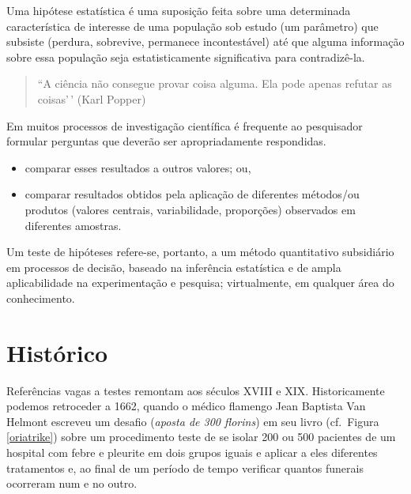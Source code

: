 \documentclass[
]{book}
\providecommand{\tightlist}{%
  \setlength{\itemsep}{0pt}\setlength{\parskip}{0pt}}
\begin{document}
\hfill\break

Uma hipótese estatística é uma suposição feita sobre uma determinada característica de interesse de uma população sob estudo (um parâmetro) que subsiste (perdura, sobrevive, permanece incontestável) até que alguma informação sobre essa população seja estatisticamente significativa para contradizê-la.

\hfill\break

\begin{quote}
``A ciência não consegue provar coisa alguma. Ela pode apenas refutar as coisas'\,' (Karl Popper)
\end{quote}

\hfill\break

Em muitos processos de investigação científica é frequente ao pesquisador formular perguntas que deverão ser apropriadamente respondidas.

\hfill\break

\begin{itemize}
\tightlist
\item
  comparar esses resultados a outros valores; ou,\\
\item
  comparar resultados obtidos pela aplicação de diferentes métodos/ou produtos (valores centrais, variabilidade, proporções) observados em diferentes amostras.
\end{itemize}

\hfill\break

Um teste de hipóteses refere-se, portanto, a um método quantitativo subsidiário em processos de decisão, baseado na inferência estatística e de ampla aplicabilidade na experimentação e pesquisa; virtualmente, em qualquer área do conhecimento.

\hfill\break

\hypertarget{histuxf3rico}{%
\section{Histórico}\label{histuxf3rico}}

\hfill\break

Referências vagas a testes remontam aos séculos XVIII e XIX. Historicamente podemos retroceder a 1662, quando o médico flamengo Jean Baptista Van Helmont escreveu um desafio (\emph{aposta de 300 florins}) em seu livro (cf.~Figura \ref{oriatrike}) sobre um procedimento teste de se isolar 200 ou 500 pacientes de um hospital com febre e pleurite em dois grupos iguais e aplicar a eles diferentes tratamentos e, ao final de um período de tempo verificar quantos funerais ocorreram num e no outro.
\end{document}

